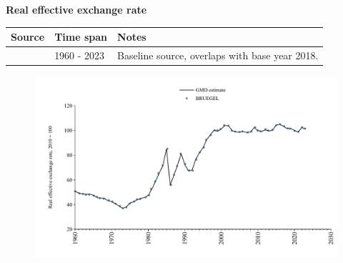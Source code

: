 \documentclass[12pt,a4paper,landscape]{article}
\begin{document}
\begin{adjustbox}{max totalsize={\paperwidth}{\paperheight},center}
\begin{minipage}[t][\textheight][t]{\textwidth}
\vspace*{0.5cm}
{}
\begin{center}
{\Large\bfseries Real effective exchange rate}
\end{center}
\vspace{0.5cm}
\begin{table}[H]
\centering
\small
\begin{tabular}{|l|l|l|}
\hline
\textbf{Source} & \textbf{Time span} & \textbf{Notes} \\
\hline
\rowcolor{white}\cite{BRUEGEL}& 1960 - 2023 &Baseline source, overlaps with base year 2018. \\
\hline
\end{tabular}
\end{table}
\begin{figure}[H]
\centering
\includegraphics[width=\textwidth,height=0.6\textheight,keepaspectratio]{graphs/SLV_REER.pdf}
\end{figure}
\end{minipage}
\end{adjustbox}
\end{document}
